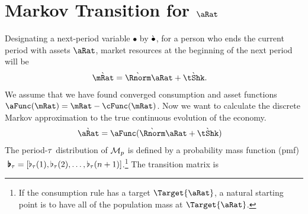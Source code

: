 \documentclass[\econtexRoot/BufferStockTheory.tex]{subfiles}
\begin{document}
\section{Markov Transition for $\aRat$}
\begin{comment}
  Our derivations will be for consumers who are living in the `true' economy.  In that economy, the transition equation for $\aRat$ is:
  \subsection{Transition for $\aRat$}
  \begin{align}
    \aRat_{\tAbs+1} & = \Rfree (\PGro \pShk_{\tAbs+1})^{-1} \aRat_{\tAbs} + \tShk_{\tAbs+1} - \cFunc_{\tAbs+1}(\Rfree (\PGro \pShk_{\tAbs+1})^{-1}\aRat_{\tAbs}+\tShk_{\tAbs+1})
    \\                \Nxt{_{\tAbs+1}^{\aRat}(\aRat_{\tAbs+1}) & = \CDF_{\tAbs+1}^{\aRat}\left(\Rfree (\PGro \pShk_{\tAbs+1})^{-1} \aRat_{\tAbs} + \tShk_{\tAbs+1} - \cFunc_{\tAbs+1}(\Rfree (\PGro \pShk_{\tAbs+1})^{-1}\aRat_{\tAbs}+\tShk_{\tAbs+1})\right)
  \end{align}
\end{comment}
Designating a next-period variable $\bullet$ by $\grave{\bullet}$, for a person who ends the current period with assets $\pnt$, market resources at the beginning of the next period will be
\begin{align}
  \Nxt{\mRat} & = \Nxt{\Rnorm}\pnt+\Nxt{\tShk}.
\end{align}
We assume that we have found converged consumption and asset functions $\aFunc(\mRat)=\mRat-\cFunc(\mRat)$.  
Now we want to calculate the discrete Markov approximation to the true continuous evolution of the economy. 
\begin{align}
  \Nxt{\pnt} & = \aFunc(\Nxt{\Rnorm} \pnt + \Nxt{\tShk})
\end{align}
The period-$\tau$ distribution of $\mathcal{M}_{p}$ is defined by a probability mass function (pmf)$~\pmb{\flat}_{\tau} = [\flat_{\tau}(1),\flat_{\tau}(2),\dots,\flat_{\tau}(n+1)]$.\footnote{If the consumption rule has a target $\Target{\aRat}$, a natural starting point is to have all of the population mass at $\Target{\aRat}$.}  The transition matrix is 
\end{document}
